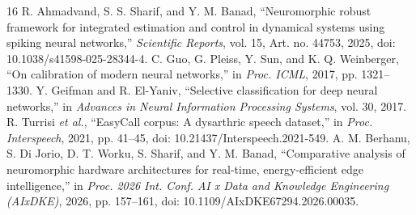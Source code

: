 \documentclass[conference]{IEEEtran}
\begin{document}
\begin{thebibliography}{16}
 R. Ahmadvand, S. S. Sharif, and Y. M. Banad, ``Neuromorphic robust framework for integrated estimation and control in dynamical systems using spiking neural networks,'' \emph{Scientific Reports}, vol. 15, Art. no. 44753, 2025, doi: 10.1038/s41598-025-28344-4.
 C. Guo, G. Pleiss, Y. Sun, and K. Q. Weinberger, ``On calibration of modern neural networks,'' in \emph{Proc. ICML}, 2017, pp. 1321--1330.
 Y. Geifman and R. El-Yaniv, ``Selective classification for deep neural networks,'' in \emph{Advances in Neural Information Processing Systems}, vol. 30, 2017.
 R. Turrisi \emph{et al.}, ``EasyCall corpus: A dysarthric speech dataset,'' in \emph{Proc. Interspeech}, 2021, pp. 41--45, doi: 10.21437/Interspeech.2021-549.
 A. M. Berhanu, S. Di Jorio, D. T. Worku, S. Sharif, and Y. M. Banad, ``Comparative analysis of neuromorphic hardware architectures for real-time, energy-efficient edge intelligence,'' in \emph{Proc. 2026 Int. Conf. AI x Data and Knowledge Engineering (AIxDKE)}, 2026, pp. 157--161, doi: 10.1109/AIxDKE67294.2026.00035.
\end{thebibliography}
\end{document}
